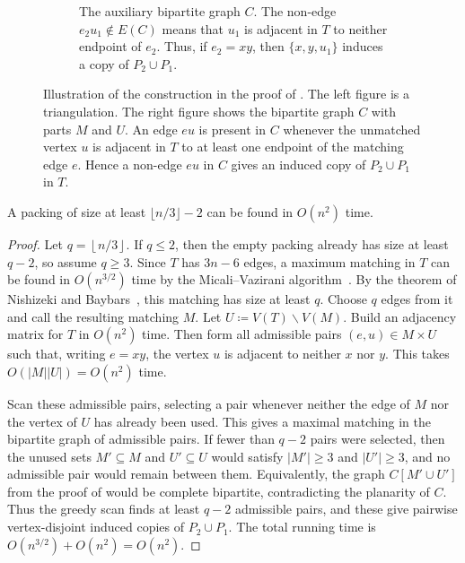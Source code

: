 \documentclass{patmorin}
\newcommand{\sm}{\smallsetminus}
\begin{document}
\begin{figure}[H]
\begin{subfigure}[t]{0.48\textwidth}
{%
}
\caption{The auxiliary bipartite graph $C$. The non-edge
$e_2u_1\notin E(C)$ means that $u_1$ is adjacent in $T$ to neither endpoint
of $e_2$. Thus, if $e_2=xy$, then $\{x,y,u_1\}$ induces a copy of
$P_2\cup P_1$.}
\end{subfigure}

\caption{Illustration of the construction in the proof of
. The left figure is a triangulation. The right figure
shows the bipartite graph $C$ with parts $M$ and $U$. An edge $eu$ is present
in $C$ whenever the unmatched vertex $u$ is adjacent in $T$ to at least one
endpoint of the matching edge $e$. Hence a non-edge $eu$ in $C$ gives an
induced copy of $P_2\cup P_1$ in $T$.}
\label{fig:p2p1-schematic}
\end{figure}


\begin{cor}\label{cor:p2p1-algorithm}
A packing of size at least $\lfloor n/3\rfloor-2$ can be found in
$O(n^2)$ time.
\end{cor}

\begin{proof}
Let  $q=\left\lfloor n/3 \right\rfloor$.
If $q\le 2$, then the empty packing already has size at least $q-2$, so assume $q\ge 3$.
Since $T$ has $3n-6$ edges, a maximum matching in $T$ can be found in
$O(n^{3/2})$ time by the Micali--Vazirani algorithm~\cite{MicaliVazirani1980}.
By the theorem of Nishizeki and Baybars~\cite{NishizekiBaybars1979}, this
matching has size at least $q$. Choose $q$ edges from it and call the resulting matching $M$. 
Let $U\coloneqq V(T)\sm V(M)$.
Build an adjacency matrix for $T$ in $O(n^2)$ time. Then form all
admissible pairs $(e,u)\in M\times U$ such that, writing $e=xy$, the
vertex $u$ is adjacent to neither $x$ nor $y$. This takes $O(|M||U|)=O(n^2)$ time.

Scan these admissible pairs, selecting a pair whenever neither the
edge of $M$ nor the vertex of $U$ has already been used. This gives a
maximal matching in the bipartite graph of admissible pairs. If fewer than
$q-2$ pairs were selected, then the unused sets $M'\subseteq M$ and
$U'\subseteq U$ would satisfy $|M'|\ge 3$ and  $|U'|\ge 3$, and no admissible pair would remain between them. Equivalently, the graph
$C[M'\cup U']$ from the proof of  would be complete
bipartite, contradicting the planarity of $C$. Thus the greedy scan finds at
least $q-2$ admissible pairs, and these give pairwise vertex-disjoint induced
copies of $P_2\cup P_1$. The total running time is $O(n^{3/2})+O(n^2)=O(n^2)$.
\end{proof}
\end{document}
